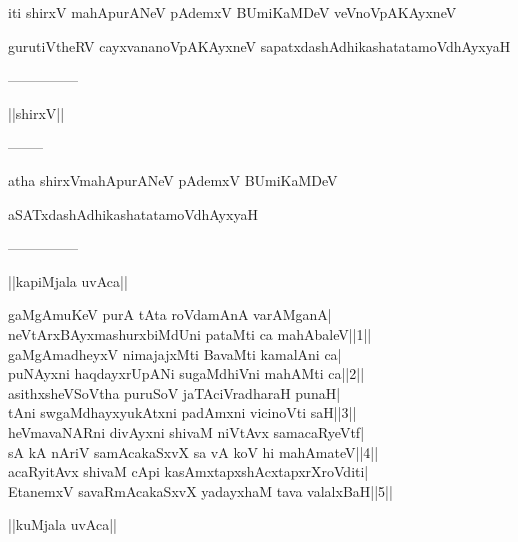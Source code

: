 \documentclass{article}
\begin{document}
\begin{center}
iti shirxV mahApurANeV pAdemxV BUmiKaMDeV veVnoVpAKAyxneV
\end{center}

\begin{center}
gurutiVtheRV cayxvananoVpAKAyxneV sapatxdashAdhikashatatamoVdhAyxyaH
\end{center}

\begin{center}
---------------
\end{center}

\begin{center}
||shirxV||
\end{center}

\begin{center}
--------
\end{center}

\begin{center}
atha shirxVmahApurANeV pAdemxV BUmiKaMDeV
\end{center}

\begin{center}
aSATxdashAdhikashatatamoVdhAyxyaH
\end{center}

\begin{center}
---------------
\end{center}

\begin{center}
||kapiMjala uvAca||
\end{center}

gaMgAmuKeV purA tAta roVdamAnA varAMganA|\\
neVtArxBAyxmashurxbiMdUni pataMti ca mahAbaleV||1||\\
gaMgAmadheyxV nimajajxMti BavaMti kamalAni ca|\\
puNAyxni haqdayxrUpANi sugaMdhiVni mahAMti ca||2||\\
asithxsheVSoVtha puruSoV jaTAciVradharaH punaH|\\
tAni swgaMdhayxyukAtxni padAmxni vicinoVti saH||3||\\
heVmavaNARni divAyxni shivaM niVtAvx samacaRyeVtf|\\
sA kA nAriV samAcakaSxvX sa vA koV hi mahAmateV||4||\\
acaRyitAvx shivaM cApi kasAmxtapxshAcxtapxrXroVditi|\\
EtanemxV savaRmAcakaSxvX yadayxhaM tava valalxBaH||5||\\

\begin{center}
||kuMjala uvAca||
\end{center}
\end{document}
